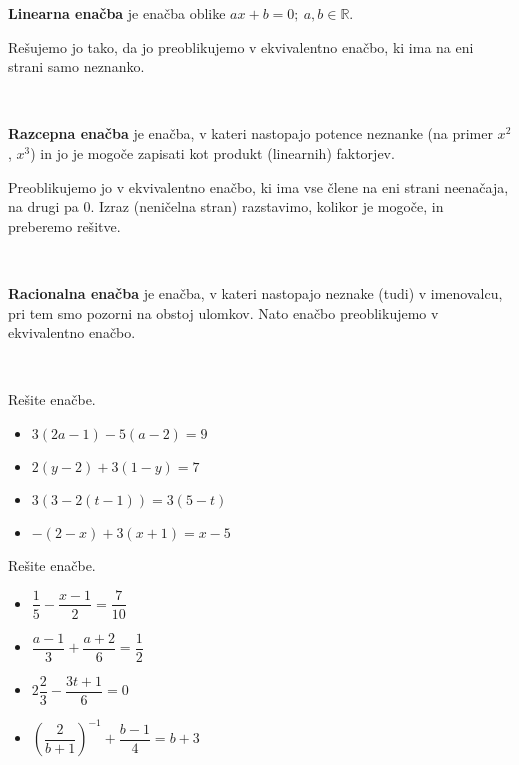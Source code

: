                \textbf{Linearna enačba} je enačba oblike $ax+b=0;~a,b\in\mathbb{R}$.

                Rešujemo jo tako, da jo preoblikujemo v ekvivalentno enačbo, ki ima na eni strani samo neznanko.
            
~~

                \textbf{Razcepna enačba} je enačba, v kateri nastopajo potence neznanke (na primer $x^2$, $x^3$) in jo je mogoče zapisati kot produkt (linearnih) faktorjev.

                Preoblikujemo jo v ekvivalentno enačbo, ki ima vse člene na eni strani neenačaja, na drugi pa $0$. 
                Izraz (neničelna stran) razstavimo, kolikor je mogoče, in preberemo rešitve.
            
~~

                \textbf{Racionalna enačba} je enačba, v kateri nastopajo neznake (tudi) v imenovalcu, pri tem smo pozorni na obstoj ulomkov. 
                Nato enačbo preoblikujemo v ekvivalentno enačbo.
            

        ~~~\\




        
            \begin{naloga}
                Rešite enačbe.
                \begin{itemize}
                        \item $3(2a-1)-5(a-2)=9$ 
                        \item $2(y-2)+3(1-y)=7$ 
                        \item $3(3-2(t-1))=3(5-t)$ 
                        \item $-(2-x)+3(x+1)=x-5$ 
                \end{itemize}
            \end{naloga}
        


        
            \begin{naloga}
                Rešite enačbe.
                \begin{itemize}
                        \item $\dfrac{1}{5}-\dfrac{x-1}{2}=\dfrac{7}{10}$ 
                        \item $\dfrac{a-1}{3}+\dfrac{a+2}{6}=\dfrac{1}{2}$ 
                        \item $2\dfrac{2}{3}-\dfrac{3t+1}{6}=0$ 
                        \item $\left(\dfrac{2}{b+1}\right)^{-1}+\dfrac{b-1}{4}=b+3$ 
                \end{itemize}
            \end{naloga}
        



